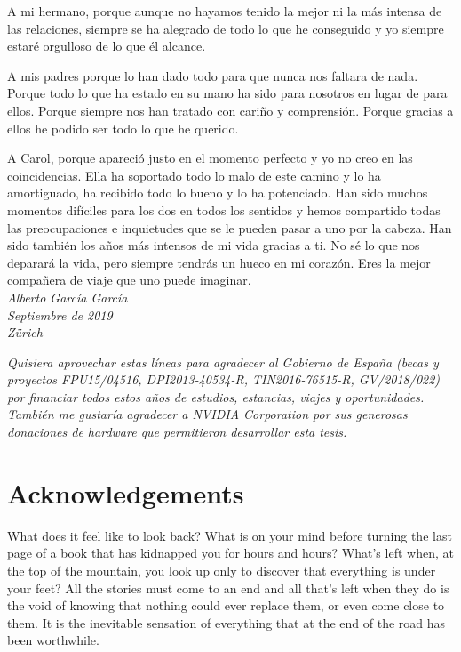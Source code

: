 A mi hermano, porque aunque no hayamos tenido la mejor ni la más intensa de las relaciones, siempre se ha alegrado de todo lo que he conseguido y yo siempre estaré orgulloso de lo que él alcance.

A mis padres porque lo han dado todo para que nunca nos faltara de nada. Porque todo lo que ha estado en su mano ha sido para nosotros en lugar de para ellos. Porque siempre nos han tratado con cariño y comprensión. Porque gracias a ellos he podido ser todo lo que he querido.

A Carol, porque apareció justo en el momento perfecto y yo no creo en las coincidencias. Ella ha soportado todo lo malo de este camino y lo ha amortiguado, ha recibido todo lo bueno y lo ha potenciado. Han sido muchos momentos difíciles para los dos en todos los sentidos y hemos compartido todas las preocupaciones e inquietudes que se le pueden pasar a uno por la cabeza. Han sido también los años más intensos de mi vida gracias a ti. No sé lo que nos deparará la vida, pero siempre tendrás un hueco en mi corazón. Eres la mejor compañera de viaje que uno puede imaginar.\\

\noindent\emph{Alberto García García}\\
\emph{Septiembre de 2019}\\
\emph{Zürich}\\

\vfill

\emph{Quisiera aprovechar estas líneas para agradecer al Gobierno de España (becas y proyectos FPU15/04516, DPI2013-40534-R, TIN2016-76515-R, GV/2018/022) por financiar todos estos años de estudios, estancias, viajes y oportunidades. También me gustaría agradecer a NVIDIA Corporation por sus generosas donaciones de hardware que permitieron desarrollar esta tesis.}\\

\chapter{Acknowledgements}

What does it feel like to look back? What is on your mind before turning the last page of a book that has kidnapped you for hours and hours? What's left when, at the top of the mountain, you look up only to discover that everything is under your feet? All the stories must come to an end and all that's left when they do is the void of knowing that nothing could ever replace them, or even come close to them. It is the inevitable sensation of everything that at the end of the road has been worthwhile.

